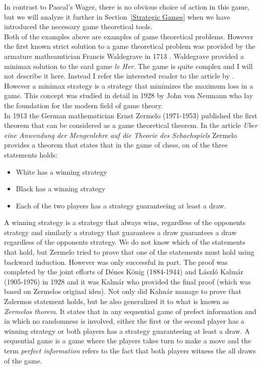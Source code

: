 \documentclass{article}
\theoremstyle{definition}
\theoremstyle{remark}
\begin{document}
In contrast to Pascal's Wager, there is no obvious choice of action in
this game, but we will analyze it further in Section~\ref{Strategic Games} when we
  have introduced the necessary game theoretical tools.\\

Both of the examples above are examples of game theoretical
problems. However the first known strict solution to a game theoretical
problem was provided by the armature matheamtician Francis Waldegrave
in 1713 \citep{Fillion2015}. Waldegrave provided a minimax solution to
the card game \emph{le Her}. The game is quite complex and I
will not describe it here. Instead I refer the interested reader to
the article by \cite{Fillion2015}. However a minimax strategy is a
strategy that minimizes the maximum loss in a game. This concept was studied in detail in 1928 by John von
Neumann who lay the foundation for the modern field of game theory.\\

In 1913 the German mathematician Ernst Zermelo (1971-1953) published
the first theorem that can be considered as a game theoretical
theorem. In the article \emph{Uber eine Anwendung der Mengenlehre auf die
  Theorie des Schachspiels} Zermelo provides a theorem that states
that in the game of chess, on of the three statements holds:
\begin{itemize}
\item White has a winning strategy
\item Black has a winning strategy
  \item Each of the two players has a strategy guaranteeing at least a
    draw. \citep{Schwalbe2001}
  \end{itemize}
  A winning strategy is a strategy that always wins, regardless of the
  opponents strategy and similarly a strategy that guarantees a draw
  guarantees a draw regardless of the opponents strategy. We do not
  know which of the statements that hold, but Zermelo tried to prove
  that one of the statements must hold using backward
  induction. However was only successful in part. The proof was
  completed by the joint efforts of Dénes König (1884-1944) and László
  Kalmár (1905-1976) in 1928 and it was Kalmár who provided the final proof
  (which was based on Zermelos original idea). Not only did Kalmár manage
  to prove that Zalermos statement holds, but he also generalized it to
  what is known as \emph{Zermelos thorem}. It states that in any
  sequential game of prefect information and in which no randomness is
  involved, either the first or the second player has a winning
  strategy or both players has a strategy guaranteeing at least a
    draw. \citep{Schwalbe2001} A sequential game is a game where the players takes turn to
    make a move and the term \emph{perfect information} refers to the
    fact that both players witness the all draws of the game.\\
\end{document}
